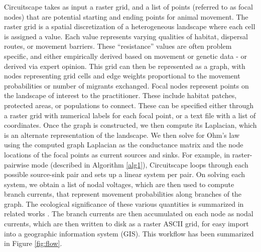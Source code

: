 \documentclass{juliacon}
\begin{document}
Circuitscape takes as input a raster grid, and a list of points (referred to as focal nodes) that are potential starting and ending points for animal movement. The raster grid is a spatial discretization of a heterogeneous landscape where each cell is assigned a value. Each value represents varying qualities of habitat, dispersal routes, or movement barriers. These “resistance” values are often problem specific, and either empirically derived based on movement or genetic data - or derived via expert opinion. This grid can then be represented as a graph, with nodes representing grid cells and edge weights proportional to the movement probabilities or number of migrants exchanged. Focal nodes represent points on the landscape of interest to the practitioner. These include habitat patches, protected areas, or populations to connect. These can be specified either through a raster grid with numerical labels for each focal point, or a text file with a list of coordinates. Once the graph is constructed, we then compute its Laplacian, which is an alternate representation of the landscape. We then solve for Ohm’s law using the computed graph Laplacian as the conductance matrix and the node locations of the focal points as current sources and sinks. For example, in raster-pairwise mode (described in Algorithm \ref{alg1}), Circuitscape loops through each possible source-sink pair and sets up a linear system per pair. On solving each system, we obtain a list of nodal voltages, which are then used to compute branch currents, that represent movement probabilities along branches of the graph. The ecological significance of these various quantities is summarized in related works \cite{mcrae2008using}. The branch currents are then accumulated on each node as nodal currents, which are then written to disk as a raster ASCII grid, for easy import into a geographic information system (GIS). This workflow has been summarized in Figure \ref{fig:flow}. 
\end{document}
